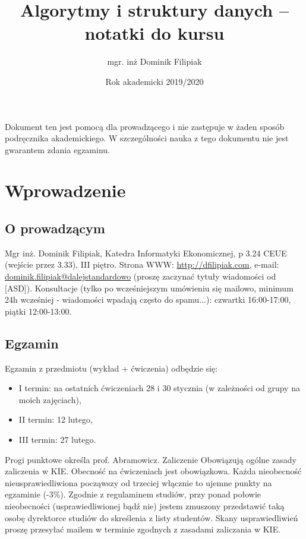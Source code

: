 \documentclass[10pt, oneside]{article}
\title{Algorytmy i struktury danych -- notatki do kursu}
\author{mgr. inż Dominik Filipiak}
\date{Rok akademicki 2019/2020}
\theoremstyle{remark}
\begin{document}
\maketitle
\tableofcontents

\vspace{.25in}

Dokument ten jest pomocą dla prowadzącego i nie zastępuje w żaden sposób podręcznika akademickiego.
W szczególności nauka z tego dokumentu nie jest gwarantem zdania egzaminu.

\section{Wprowadzenie}

\subsection{O prowadzącym}
Mgr inż. Dominik Filipiak, Katedra Informatyki Ekonomicznej, p 3.24 CEUE (wejście przez 3.33), III piętro.
Strona WWW: \url{http://dfilipiak.com}, e-mail: \url{dominik.filipiak@dalejstandardowo} (proszę zaczynać tytuły wiadomości od [ASD]).
Konsultacje (tylko po wcześniejszym umówieniu się mailowo, minimum 24h wcześniej - wiadomości wpadają często do spamu...): czwartki 16:00-17:00, piątki 12:00-13:00.

\subsection{Egzamin}
Egzamin z przedmiotu (wykład + ćwiczenia) odbędzie się:
\begin{itemize}
	\item I termin: na ostatnich ćwiczeniach 28 i 30 stycznia (w zależności od grupy na moich zajęciach),
	\item II termin: 12 lutego,
	\item III termin: 27 lutego.
\end{itemize}
Progi punktowe określa prof. Abramowicz.
Zaliczenie
Obowiązują ogólne zasady zaliczenia w KIE. Obecność na ćwiczeniach jest obowiązkowa. Każda nieobecność nieusprawiedliwiona począwszy od trzeciej włącznie to ujemne punkty na egzaminie (-3\%).
Zgodnie z regulaminem studiów, przy ponad połowie nieobecności (usprawiedliwionej bądź nie) jestem zmuszony przedstawić taką osobę dyrektorce studiów do skreślenia z listy studentów. Skany usprawiedliwień proszę przesyłać mailem w terminie zgodnych z zasadami zaliczania w KIE.
\end{document}
